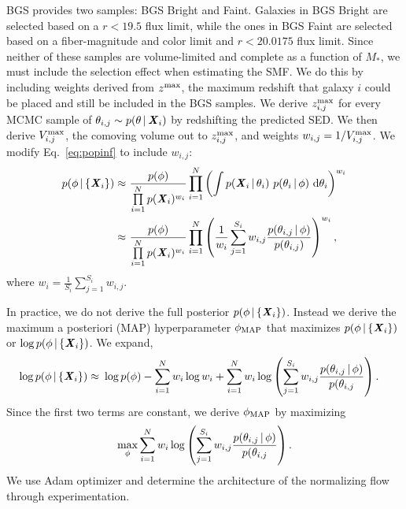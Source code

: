 BGS provides two samples: BGS Bright and Faint. 
Galaxies in BGS Bright are selected based on a $r < 19.5$ flux limit, while
the ones in BGS Faint are selected based on a fiber-magnitude and color limit
and $r < 20.0175$ flux limit. 
Since neither of these samples are volume-limited and complete as a function
of $M_*$, we must include the selection effect when estimating the SMF. 
We do this by including weights derived from $z^{\rm max}$, the maximum
redshift that galaxy $i$ could be placed and still be included in the BGS
samples. 
We derive $z^{\rm max}_{i,j}$ for every MCMC sample of 
$\theta_{i,j}\sim p(\theta \,|\, {\textbf{\textit{X}}_i})$ by redshifting the predicted
SED. 
We then derive $V^{\rm max}_{i,j}$, the comoving volume out to 
$z^{\rm max}_{i,j}$, and weights $w_{i,j} = 1/V^{\rm max}_{i,j}$. 
We modify Eq.~\ref{eq:popinf} to include $w_{i,j}$: 
\begin{align}
p(\phi \,|\, \{{\textbf{\textit{X}}_i}\}) 
    \approx&~\frac{p(\phi)}{\prod\limits_{i=1}^N p({\textbf{\textit{X}}_i})^{w_i}} 
    \prod\limits_{i=1}^N \left(\int p({\textbf{\textit{X}}_i} \,|\, \theta_i)~p(\theta_i \,|\, \phi)~{\rm d}\theta_i \right)^{w_i} \\ 
    \approx&~\frac{p(\phi)}{\prod\limits_{i=1}^N p({\textbf{\textit{X}}_i})^{w_i}} 
    \prod\limits_{i=1}^N \left( \frac{1}{w_i} \sum\limits_{j=1}^{S_i} w_{i,j}
    \frac{p(\theta_{i,j} \,|\, \phi)}{p(\theta_{i,j})} \right)^{w_i},
\end{align} 
where $w_i = \frac{1}{S_i} \sum\limits_{j=1}^{S_i} w_{i,j}$. 

In practice, we do not derive the full posterior 
$p(\phi \,|\, \{{\textbf{\textit{X}}_i}\})$. 
Instead we derive the maximum a posteriori (MAP) hyperparameter 
$\phi_{\rm MAP}$ that maximizes $p(\phi \,|\, \{{\textbf{\textit{X}}_i}\})$ or 
$\log p(\phi \,|\, \{{\textbf{\textit{X}}_i}\})$.
We expand, 
\begin{align}
\log p(\phi \,|\, \{{\textbf{\textit{X}}_i}\}) 
    \approx&~\log p(\phi) - 
    \sum\limits_{i=1}^N w_i \log w_i + 
    \sum\limits_{i=1}^N w_i \log \left(\sum\limits_{j=1}^{S_i} w_{i,j} \frac{p(\theta_{i,j} \,|\, \phi)}{p(\theta_{i,j}} \right).
\end{align} 
Since the first two terms are constant, we derive $\phi_{\rm MAP}$ by
maximizing 
\begin{equation}
    \max_\phi \sum\limits_{i=1}^N w_i \log \left(\sum\limits_{j=1}^{S_i} w_{i,j} \frac{p(\theta_{i,j} \,|\, \phi)}{p(\theta_{i,j}} \right).
\end{equation}
We use {\sc Adam} optimizer and determine the architecture of the normalizing
flow through experimentation.  


